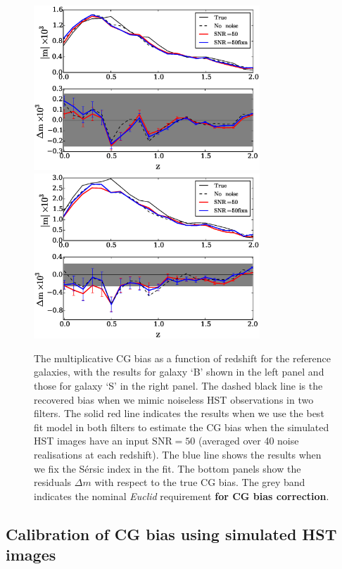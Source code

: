 \documentclass[useAMS,usenatbib]{mnras}
\begin{document}
\begin{figure}
  \centerline{
  \includegraphics[width=8.5cm]{zs2n_b_snrtt50.eps}
  \includegraphics[width=8.5cm]{zs2n_s_snrtt50.eps}}
\caption{The multiplicative CG bias as a function of redshift
  for the reference galaxies, with the results for galaxy `B' shown
  in the left panel and those for galaxy `S' in the right panel.
  The dashed black line is the recovered bias when we mimic
  noiseless HST observations in two filters. The solid red line
  indicates the results when we use the best fit {} model
  in both filters to estimate the CG bias when the simulated HST images have
  an input $\mathrm{SNR}=50$ (averaged over 40 noise realisations at each
  redshift). The blue line shows the results when we fix the S{\'e}rsic index
  in the fit. The bottom panels show the residuals $\Delta m$ with respect
  to the true CG bias. The grey band indicates the
  nominal {\it Euclid} requirement {\bf for CG bias correction}.}
\label{fig:biasofz50}
\end{figure}


\subsection{Calibration of CG bias using simulated HST images}
\label{sec:noisy}
\end{document}
